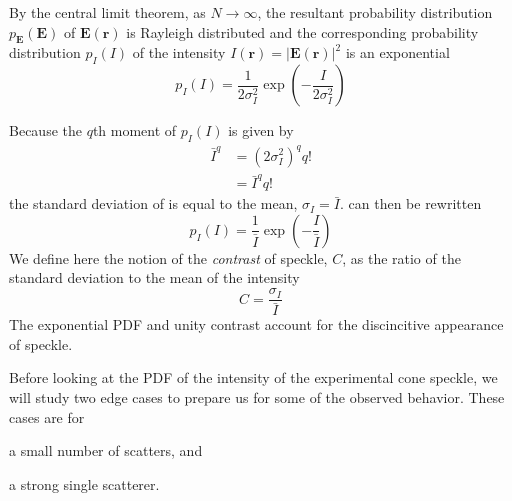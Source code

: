 By the central limit theorem, as $N\to\infty$, the resultant probability
distribution $p_\mathbf{E}(\mathbf{E})$ of $\mathbf{E}(\mathbf{r})$ is Rayleigh distributed and the
corresponding probability distribution $p_I(I)$ of the intensity
$I(\mathbf{r})=|\mathbf{E}(\mathbf{r})|^2$ is an exponential
\begin{equation}
p_I(I) = \frac{1}{2\sigma_I^2}\exp\left(-\frac{I}{2\sigma_I^2}\right)
\label{eqn:propexp}
\end{equation}

Because the $q$th moment of $p_I(I)$ is given by 
\begin{align}
\bar{I}^q&=(2\sigma_I^2)^q q!\\
         &=\bar{I}^q q!
\end{align}
the standard deviation of is equal to the mean,
$\sigma_I=\bar{I}$.   can then be rewritten
\begin{equation}
p_I(I) = \frac{1}{\bar{I}}\exp\left(-\frac{I}{\bar{I}}\right)
\label{eqn:exppdf}
\end{equation}
We define here the notion of the \textit{contrast} of speckle, $C$, as the
ratio of the standard deviation to the mean of the intensity
\begin{equation}
C=\frac{\sigma_I}{\bar{I}}
\label{eqn:specklecontrast}
\end{equation}
The exponential PDF and unity contrast account for the discincitive
appearance of speckle.

Before looking at the PDF of the intensity of the experimental cone
speckle, we will study two edge cases to prepare us for some of the
observed behavior.  These cases are for
\begin{inparaenum}[(a)]
\item a small number of scatters, and 
\item a strong single scatterer.
\end{inparaenum}
